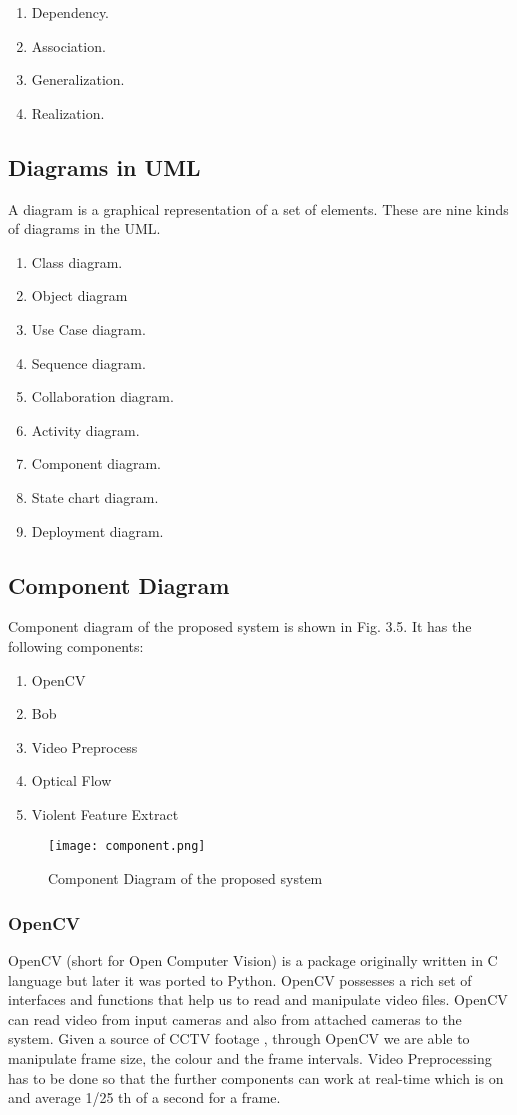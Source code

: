 \begin{enumerate}
	\item Dependency.
	\item Association.
	\item Generalization.
	\item Realization.
\end{enumerate}
\subsection{Diagrams in UML}
A diagram is a graphical representation of a set of elements. These are nine kinds of diagrams in the UML.
\begin{enumerate}
	\item Class diagram.                 
\item  Object diagram                
\item  Use Case diagram.               
\item  Sequence diagram.             
\item  Collaboration diagram.
\item  Activity diagram.
\item  Component diagram.
\item  State chart diagram.
\item  Deployment diagram.

\end{enumerate}
\subsection{Component Diagram}
Component diagram of the proposed system is shown in Fig. 3.5. It has the following components:
\begin{enumerate}
	\item OpenCV
	\item Bob
	\item Video Preprocess
	\item Optical Flow
	\item Violent Feature Extract
\end{enumerate}
\begin{center}
\begin{figure}[H]
\centering
\texttt{[image: component.png]}
\caption{Component Diagram of the proposed system}
\end{figure}
\end{center}
\subsubsection{OpenCV}
OpenCV (short for Open Computer Vision)\cite{opencv} is a package originally written in C language but later it was ported to Python. OpenCV possesses a rich set of interfaces and functions  that help us to read and manipulate video files. OpenCV can read video from input cameras and also from attached cameras to the system. Given a source of CCTV footage , through OpenCV we are able to manipulate frame size, the colour and the frame intervals. Video Preprocessing has to be done so that the further components can work at real-time which is on and average 1/25 th of a second for a frame.
